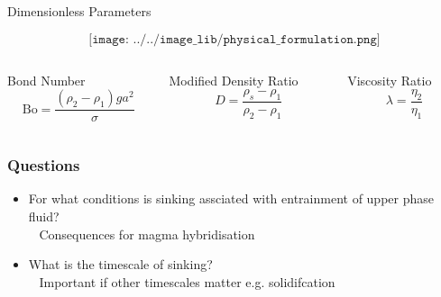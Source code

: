 \documentclass{beamer}
\begin{document}
\begin{frame}{Dimensionless Parameters}

  \begin{figure}
    $$\texttt{[image: ../../image\_lib/physical\_formulation.png]}$$
  \end{figure}

  \begin{columns}[c]
    \begin{column}{0.3\paperwidth}
      \centering
      Bond Number
      \begin{equation}
        \text{Bo} = \frac{(\rho_{2} - \rho_{1}) g a^{2}}{\sigma} \nonumber
      \end{equation}
    \end{column}

    \begin{column}{0.3\paperwidth}
      \centering
      Modified Density Ratio
      \begin{equation}
        D = \frac{\rho_{s} - \rho_{1}}{\rho_{2} - \rho_{1}} \nonumber
      \end{equation}
    \end{column}

    \begin{column}{0.3\paperwidth}
      \centering
      Viscosity Ratio
      \begin{equation}
        \lambda = \frac{\eta_{2}}{\eta_{1}} \nonumber
      \end{equation}
    \end{column}

  \end{columns}

\end{frame}


\begin{frame}
  \frametitle{Questions}

  \begin{itemize}
    \item For what conditions is sinking assciated with entrainment of upper phase fluid? \\
      ~ Consequences for magma hybridisation
       \vspace{1cm}
    \item What is the timescale of sinking? \\
      ~ Important if other timescales matter e.g. solidifcation
      \vspace{1cm}
  \end{itemize}

\end{frame}
\end{document}
